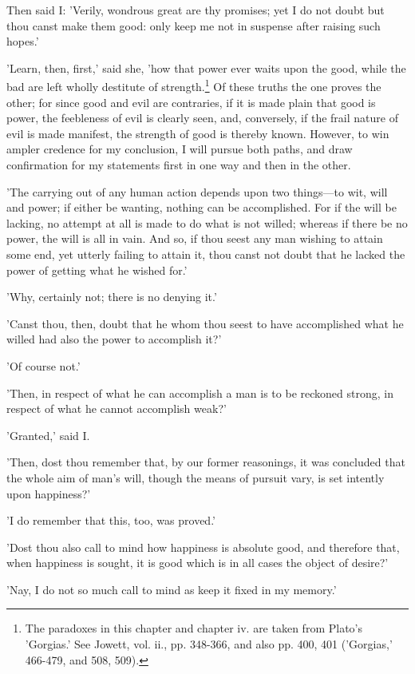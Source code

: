 
Then said I: 'Verily, wondrous great are thy promises; yet I do not
doubt but thou canst make them good: only keep me not in suspense after
raising such hopes.'

'Learn, then, first,' said she, 'how that power ever waits upon the
good, while the bad are left wholly destitute of strength.\footnote{The paradoxes in this chapter and chapter iv. are taken
from Plato's 'Gorgias.' See Jowett, vol. ii., pp. 348-366, and also pp.
400, 401 ('Gorgias,' 466-479, and 508, 509).} Of these
truths the one proves the other; for since good and evil are contraries,
if it is made plain that good is power, the feebleness of evil is
clearly seen, and, conversely, if the frail nature of evil is made
manifest, the strength of good is thereby known. However, to win ampler
credence for my conclusion, I will pursue both paths, and draw
confirmation for my statements first in one way and then in the other.

'The carrying out of any human action depends upon two things—to wit,
will and power; if either be wanting, nothing can be accomplished. For
if the will be lacking, no attempt at all is made to do what is not
willed; whereas if there be no power, the will is all in vain. And so,
if thou seest any man wishing to attain some end, yet utterly failing to
attain it, thou canst not doubt that he lacked the power of getting what
he wished for.'

'Why, certainly not; there is no denying it.'

'Canst thou, then, doubt that he whom thou seest to have accomplished
what he willed had also the power to accomplish it?'

'Of course not.'

'Then, in respect of what he can accomplish a man is to be reckoned
strong, in respect of what he cannot accomplish weak?'

'Granted,' said I.

'Then, dost thou remember that, by our former reasonings, it was
concluded that the whole aim of man's will, though the means of pursuit
vary, is set intently upon happiness?'

'I do remember that this, too, was proved.'

'Dost thou also call to mind how happiness is absolute good, and
therefore that, when happiness is sought, it is good which is in all
cases the object of desire?'

'Nay, I do not so much call to mind as keep it fixed in my memory.'

